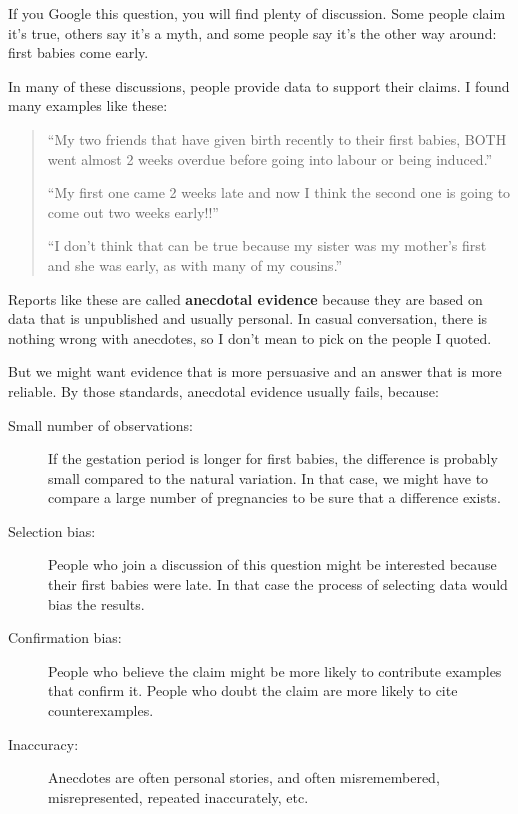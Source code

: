 \documentclass[12pt]{book}
\begin{document}
If you Google this question, you will find plenty of discussion.
Some people claim it's true, others say it's a myth, and some people
say it's the other way around: first babies come early.

In many of these discussions, people provide data to support their
claims.  I found many examples like these:

\begin{quote}

``My two friends that have given birth recently to their first babies,
BOTH went almost 2 weeks overdue before going into labour or being
induced.''

``My first one came 2 weeks late and now I think the second one is
going to come out two weeks early!!''

``I don't think that can be true because my sister was my mother's
first and she was early, as with many of my cousins.''

\end{quote}

Reports like these are called {\bf anecdotal evidence} because they
are based on data that is unpublished and usually personal.  In casual
conversation, there is nothing wrong with anecdotes, so I don't mean
to pick on the people I quoted.


But we might want evidence that is more persuasive and
an answer that is more reliable.  By those standards, anecdotal
evidence usually fails, because:

\begin{description}

\item[Small number of observations:] If the gestation period is longer
  for first babies, the difference is probably small compared to the
  natural variation.  In that case, we might have to compare a large
  number of pregnancies to be sure that a difference exists.


\item[Selection bias:] People who join a discussion of this question
  might be interested because their first babies were late.  In that
  case the process of selecting data would bias the results.


\item[Confirmation bias:] People who believe the claim might be more
  likely to contribute examples that confirm it.  People who doubt the
  claim are more likely to cite counterexamples.


\item[Inaccuracy:] Anecdotes are often personal stories, and often
  misremembered, misrepresented, repeated
  inaccurately, etc.

\end{description}
\end{document}
